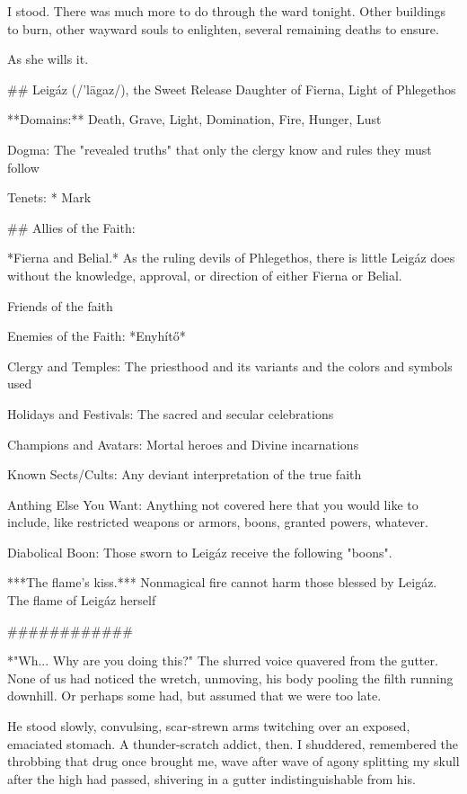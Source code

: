 I stood.
There was much more to do through the ward tonight.
Other buildings to burn, other wayward souls to enlighten, several remaining deaths to ensure.

As she wills it.


## Leigáz (/'lāgaz/), the Sweet Release
Daughter of Fierna, Light of Phlegethos

**Domains:** Death, Grave, Light, Domination, Fire, Hunger, Lust

Dogma:
The "revealed truths" that only the clergy know and rules they must follow

Tenets:
* Mark

## Allies of the Faith:

*Fierna and Belial.*
As the ruling devils of Phlegethos, there is little Leigáz does without
 the knowledge, approval, or direction of either Fierna or Belial.

Friends of the faith

Enemies of the Faith:
*Enyhítő*

Clergy and Temples:
The priesthood and its variants and the colors and symbols used

Holidays and Festivals:
The sacred and secular celebrations

Champions and Avatars:
Mortal heroes and Divine incarnations

Known Sects/Cults:
Any deviant interpretation of the true faith

Anthing Else You Want:
Anything not covered here that you would like to include, like restricted weapons or armors, boons, granted powers, whatever.

Diabolical Boon:
Those sworn to Leigáz receive the following "boons".

***The flame's kiss.***
Nonmagical fire cannot harm those blessed by Leigáz.
The flame of Leigáz herself


############

*"Wh... Why are you doing this?"
 The slurred voice quavered from the gutter.
 None of us had noticed the wretch, unmoving, his body pooling the filth running downhill.
 Or perhaps some had, but assumed that we were too late.

 He stood slowly, convulsing, scar-strewn arms twitching over an exposed, emaciated stomach.
 A thunder-scratch addict, then.
 I shuddered, remembered the throbbing that drug once brought me, wave after wave of agony splitting my skull
  after the high had passed, shivering in a gutter indistinguishable from his.

